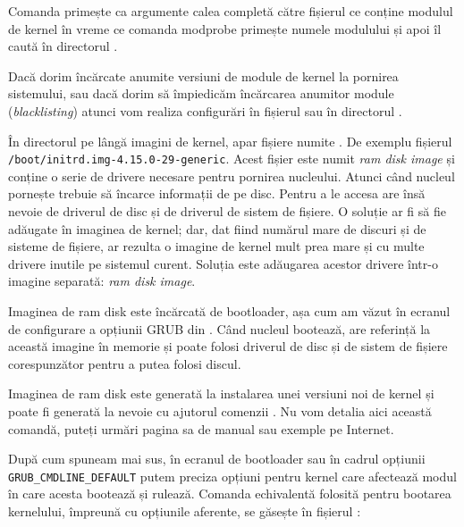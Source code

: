 Comanda  primește ca argumente calea completă către fișierul ce conține modulul de kernel în vreme ce comanda modprobe primește numele modulului și apoi îl caută în directorul .

Dacă dorim încărcate anumite versiuni de module de kernel la pornirea sistemului, sau dacă dorim să împiedicăm încărcarea anumitor module (\textit{blacklisting}) atunci vom realiza configurări în fișierul  sau în directorul .

În directorul  pe lângă imagini de kernel, apar fișiere numite .
De exemplu fișierul \texttt{/boot/initrd.img-4.15.0-29-generic}.
 Acest fișier este numit \textit{ram disk image} și conține o serie de drivere necesare pentru pornirea nucleului.
Atunci când nucleul pornește trebuie să încarce informații de pe disc.
Pentru a le accesa are însă nevoie de driverul de disc și de driverul de sistem de fișiere.
O soluție ar fi să fie adăugate în imaginea de kernel;
dar, dat fiind numărul mare de discuri și de sisteme de fișiere, ar rezulta o imagine de kernel mult prea mare și cu multe drivere inutile pe sistemul curent.
Soluția este adăugarea acestor drivere într-o imagine separată: \textit{ram disk image}.

Imaginea de ram disk este încărcată de bootloader, așa cum am văzut în ecranul de configurare a opțiunii GRUB din .
Când nucleul bootează, are referință la această imagine în memorie și poate folosi driverul de disc și de sistem de fișiere corespunzător pentru a putea folosi discul.

Imaginea de ram disk este generată la instalarea unei versiuni noi de kernel și poate fi generată la nevoie cu ajutorul comenzii .
Nu vom detalia aici această comandă, puteți urmări pagina sa de manual sau exemple pe Internet.

După cum spuneam mai sus, în ecranul de bootloader sau în cadrul opțiunii \texttt{GRUB\_CMDLINE\_DEFAULT} putem preciza opțiuni pentru kernel care afectează modul în care acesta bootează și rulează.
Comanda echivalentă folosită pentru bootarea kernelului, împreună cu opțiunile aferente, se găsește în fișierul :



